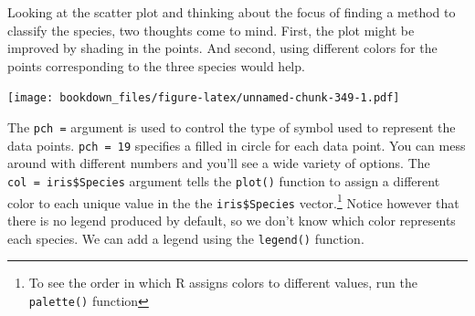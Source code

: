 \documentclass[
]{krantz}
\makeatletter
\newenvironment{Shaded}{\begin{snugshade}}{\end{snugshade}}
\newcommand{\DataTypeTok}[1]{\textcolor[rgb]{0.27,0.27,0.27}{#1}}
\newcommand{\DecValTok}[1]{\textcolor[rgb]{0.06,0.06,0.06}{#1}}
\newcommand{\FloatTok}[1]{\textcolor[rgb]{0.06,0.06,0.06}{#1}}
\newcommand{\KeywordTok}[1]{\textcolor[rgb]{0.27,0.27,0.27}{\textbf{#1}}}
\newcommand{\NormalTok}[1]{#1}
\newcommand{\OperatorTok}[1]{\textcolor[rgb]{0.43,0.43,0.43}{\textbf{#1}}}
\newenvironment{kframe}{%
\medskip{}
\setlength{\fboxsep}{.8em}
 \def\at@end@of@kframe{}%
 \ifinner\ifhmode%
  \def\at@end@of@kframe{\end{minipage}}%
  \begin{minipage}{\columnwidth}%
 \fi\fi%
 \def\FrameCommand##1{\hskip\@totalleftmargin \hskip-\fboxsep
 \colorbox{shadecolor}{##1}\hskip-\fboxsep
     \hskip-\linewidth \hskip-\@totalleftmargin \hskip\columnwidth}%
 \MakeFramed {\advance\hsize-\width
   \@totalleftmargin\z@ \linewidth\hsize
   \@setminipage}}%
 {\par\unskip\endMakeFramed%
 \at@end@of@kframe}
\renewenvironment{Shaded}{\begin{kframe}}{\end{kframe}}
\makeatother
\begin{document}
Looking at the scatter plot and thinking about the focus of finding a method to classify the species, two thoughts come to mind. First, the plot might be improved by shading in the points. And second, using different colors for the points corresponding to the three species would help.

\begin{Shaded}
\end{Shaded}

\texttt{[image: bookdown\_files/figure-latex/unnamed-chunk-349-1.pdf]}

The \texttt{pch\ =} argument is used to control the type of symbol used to represent the data points. \texttt{pch\ =\ 19} specifies a filled in circle for each data point. You can mess around with different numbers and you'll see a wide variety of options. The \texttt{col\ =\ iris\$Species} argument tells the \texttt{plot()} function to assign a different color to each unique value in the the \texttt{iris\$Species} vector.\footnote{To see the order in which R assigns colors to different values, run the \texttt{palette()} function} Notice however that there is no legend produced by default, so we don't know which color represents each species. We can add a legend using the \texttt{legend()} function.

\begin{Shaded}
\end{Shaded}
\end{document}
